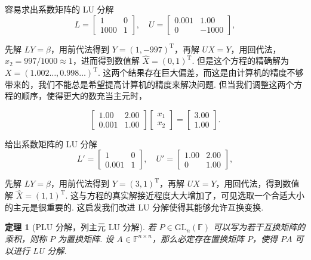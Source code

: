 \documentclass[10pt,openany]{article}
\theoremstyle{thmstyle} %
\newtheorem{theorem}{定理}[subsection]
\theoremstyle{defstyle} %
\theoremstyle{prostyle} %
\theoremstyle{exastyle}
\theoremstyle{remstyle}
\newcommand{\T}{^{\text{T}}}
\newcommand{\F}{\mathbb{F}}
\newcommand{\gfn}{\text{GL}_n(\mathbb{F})}
\newcommand{\n}{^{n \times n}}
\begin{document}
容易求出系数矩阵的 LU 分解
\[
L =
\begin{bmatrix}
	1 & 0 \\
	1000 & 1
\end{bmatrix}, \quad
U =
\begin{bmatrix}
	0.001 & 1.00 \\
	0 & -1000
\end{bmatrix},
\]

先解 \( LY=\beta \)，用前代法得到 \( Y=(1,-997)\T \)，再解 \( UX=Y \)，用回代法， \( x_2=997/1000 \approx 1 \)，进而得到数值解 \( \hat{X} = (0, 1)\T \). 但是这个方程的精确解为 \( X = (1.002\ldots, 0.998\ldots)\T \). 这两个结果存在巨大偏差，而这是由计算机的精度不够带来的，我们不能总是希望提高计算机的精度来解决问题. 但当我们调整这两个方程的顺序，使得更大的数充当主元时，

\[ \begin{bmatrix}
	1.00 & 2.00 \\
	0.001 & 1.00 
\end{bmatrix}
\begin{bmatrix}
	x_1 \\
	x_2
\end{bmatrix}
=
\begin{bmatrix}
	3.00 \\
	1.00
\end{bmatrix}. \]

给出系数矩阵的 LU 分解
\[ L'=\begin{bmatrix}
	1 & 0 \\
	0.001 & 1
\end{bmatrix}, \quad
U' =
\begin{bmatrix}
1.00 & 2.00 \\
0 & 1.00
\end{bmatrix}, \]

先解 \( LY=\beta \)，用前代法得到 \( Y=(3,1)\T \)，再解 \( UX=Y \)，用回代法，得到数值解 \( \hat{X} = (1, 1)\T \). 这与方程的真实解接近程度大大增加了，可见选取一个合适大小的主元是很重要的. 这启发我们改进 LU 分解使得其能够允许互换变换. 

\begin{theorem}[PLU 分解，列主元 LU 分解]
	若 \( P \in \gfn \) 可以写为若干互换矩阵的乘积，则称 \( P \) 为置换矩阵. 设 \( A \in \F\n \)，那么必定存在置换矩阵 \( P \)，使得 \( PA \) 可以进行 LU 分解.
\end{theorem}
\end{document}
